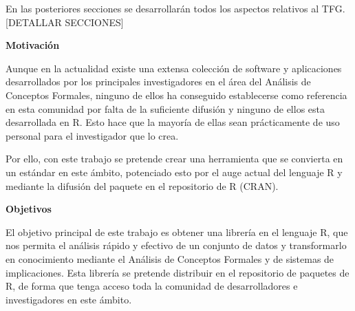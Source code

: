 En las posteriores secciones se desarrollar\'an todos los aspectos relativos al TFG. [DETALLAR SECCIONES]

\textbf{Motivaci\'on}

Aunque en la actualidad existe una extensa colecci\'on de software y aplicaciones desarrollados por los principales investigadores en el \'area del  An\'alisis de Conceptos Formales, ninguno de ellos ha conseguido establecerse como referencia en esta comunidad por falta de la suficiente difusi\'on y ninguno de ellos esta desarrollada en R. Esto hace que la mayor\'ia de ellas sean pr\'acticamente de uso personal para el investigador que lo crea. 

Por ello, con este trabajo se pretende crear una herramienta que se convierta en un est\'andar en este \'ambito, potenciado esto por el auge actual del lenguaje R y mediante la difusi\'on del paquete en el repositorio de R (CRAN).


\textbf{Objetivos}

El objetivo principal de este trabajo es obtener una librer\'ia en el lenguaje R, que nos permita el an\'alisis r\'apido y efectivo de un conjunto de datos y transformarlo en conocimiento mediante el An\'alisis de Conceptos Formales y de sistemas de implicaciones. Esta librer\'ia se pretende distribuir en el repositorio de paquetes de R, de forma que tenga acceso toda la comunidad de desarrolladores e investigadores en este \'ambito.

\newpage